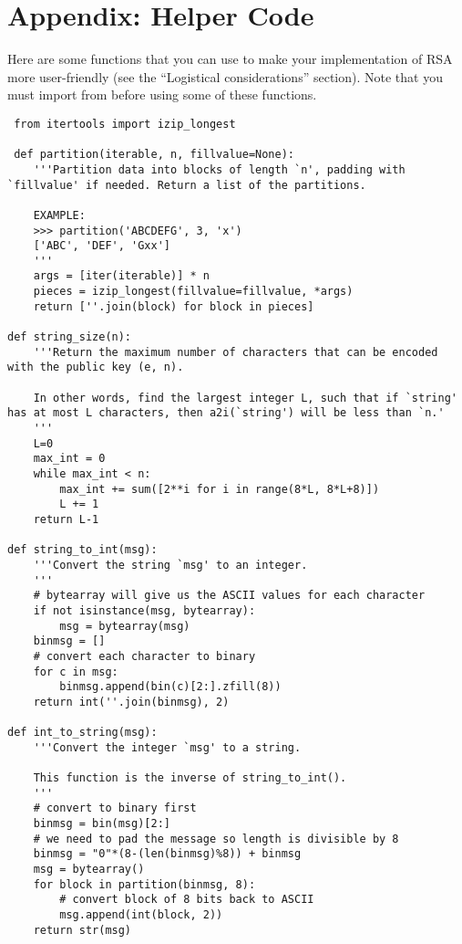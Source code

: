 \section*{Appendix: Helper Code}
Here are some functions that you can use to make your implementation of RSA more user-friendly (see the ``Logistical considerations'' section).
Note that you must import  from  before using some of these functions.
 
 \begin{lstlisting}
 from itertools import izip_longest
 
 def partition(iterable, n, fillvalue=None):
    '''Partition data into blocks of length `n', padding with `fillvalue' if needed. Return a list of the partitions.
    
    EXAMPLE:
    >>> partition('ABCDEFG', 3, 'x')
    ['ABC', 'DEF', 'Gxx']
    '''
    args = [iter(iterable)] * n
    pieces = izip_longest(fillvalue=fillvalue, *args)
    return [''.join(block) for block in pieces]
    
def string_size(n):
    '''Return the maximum number of characters that can be encoded with the public key (e, n).
    
    In other words, find the largest integer L, such that if `string' has at most L characters, then a2i(`string') will be less than `n.'
    '''
    L=0
    max_int = 0
    while max_int < n:
        max_int += sum([2**i for i in range(8*L, 8*L+8)])
        L += 1
    return L-1
    
def string_to_int(msg):
    '''Convert the string `msg' to an integer.
    '''
    # bytearray will give us the ASCII values for each character
    if not isinstance(msg, bytearray):
        msg = bytearray(msg)
    binmsg = []
    # convert each character to binary
    for c in msg:
        binmsg.append(bin(c)[2:].zfill(8))
    return int(''.join(binmsg), 2)

def int_to_string(msg):
    '''Convert the integer `msg' to a string.
    
    This function is the inverse of string_to_int().
    '''
    # convert to binary first
    binmsg = bin(msg)[2:]
    # we need to pad the message so length is divisible by 8
    binmsg = "0"*(8-(len(binmsg)%8)) + binmsg
    msg = bytearray()
    for block in partition(binmsg, 8):
        # convert block of 8 bits back to ASCII
        msg.append(int(block, 2))
    return str(msg)
 \end{lstlisting}